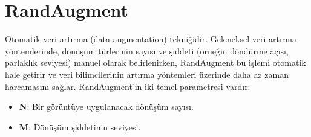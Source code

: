 \section{RandAugment}

Otomatik veri artırma (data augmentation) tekniğidir. Geleneksel veri artırma yöntemlerinde, dönüşüm türlerinin sayısı ve şiddeti (örneğin döndürme açısı, parlaklık seviyesi) manuel olarak belirlenirken, RandAugment bu işlemi otomatik hale getirir ve veri bilimcilerinin artırma yöntemleri üzerinde daha az zaman harcamasını sağlar. RandAugment’in iki temel parametresi vardır:

\begin{itemize}
    \item \textbf{N}: Bir görüntüye uygulanacak dönüşüm sayısı.
    \item \textbf{M}: Dönüşüm şiddetinin seviyesi.
\end{itemize}

\newpage
